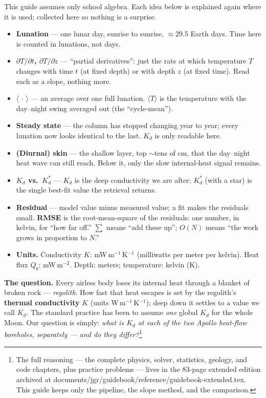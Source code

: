 \documentclass[11pt]{report}
\newcommand{\code}[1]{{\ttfamily\small #1}}
\begin{document}
\begin{plain}[title={\sffamily\bfseries Reading this guide --- the few basics you'll need}]
This guide assumes only school algebra. Each idea below is explained again where it is
used; collected here so nothing is a surprise.
\begin{itemize}[leftmargin=1.2em,itemsep=1pt,topsep=2pt]
\item \textbf{Lunation} --- one lunar day, sunrise to sunrise, $\approx29.5$ Earth days.
  Time here is counted in lunations, not days.
\item \textbf{$\partial T/\partial t$, $\partial T/\partial z$} --- ``partial derivatives'':
  just the rate at which temperature $T$ changes with time $t$ (at fixed depth) or with
  depth $z$ (at fixed time). Read each as a slope, nothing more.
\item \textbf{$\langle\,\cdot\,\rangle$} --- an average over one full lunation. $\langle
  T\rangle$ is the temperature with the day--night swing averaged out (the ``cycle-mean'').
\item \textbf{Steady state} --- the column has stopped changing year to year; every
  lunation now looks identical to the last. $K_d$ is only readable here.
\item \textbf{(Diurnal) skin} --- the shallow layer, top $\sim$tens of cm, that the
  day--night heat wave can still reach. Below it, only the slow internal-heat signal remains.
\item \textbf{$K_d$ vs.\ $K_d^{*}$} --- $K_d$ is the deep conductivity we are after;
  $K_d^{*}$ (with a star) is the single best-fit value the retrieval returns.
\item \textbf{Residual} --- model value minus measured value; a fit makes the residuals small.
  \textbf{RMSE} is the root-mean-square of the residuals: one number, in kelvin, for ``how
  far off.'' \textbf{$\textstyle\sum$} means ``add these up''; \textbf{$O(N)$} means ``the
  work grows in proportion to $N$.''
\item \textbf{Units.} Conductivity $K$: mW\,m$^{-1}$\,K$^{-1}$ (milliwatts per meter per
  kelvin). Heat flux $Q_b$: mW\,m$^{-2}$. Depth: meters; temperature: kelvin (K).
\end{itemize}
\end{plain}

\noindent\textbf{The question.} Every airless body loses its internal heat
through a blanket of broken rock --- \emph{regolith}. How fast that heat escapes
is set by the regolith's \textbf{thermal conductivity} $K$ (units
W\,m$^{-1}$\,K$^{-1}$); deep down it settles to a value we call $K_d$. The
standard practice has been to assume \emph{one} global $K_d$ for the whole Moon.
Our question is simply: \emph{what is $K_d$ at each of the two Apollo heat-flow
boreholes, separately --- and do they differ?}\footnote{The full reasoning ---
the complete physics, solver, statistics, geology, and code chapters, plus
practice problems --- lives in the 83-page extended edition archived at
\code{documents/jgr/guidebook/reference/guidebook-extended.tex}. This guide keeps only
the pipeline, the slope method, and the comparison.}
\end{document}
